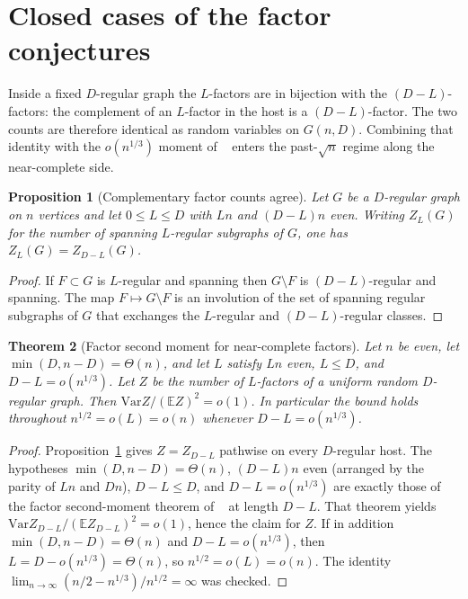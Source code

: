 \documentclass[11pt]{article}
\newtheorem{theorem}{Theorem}
\newtheorem{proposition}[theorem]{Proposition}
\newcommand{\EE}{\mathbb{E}}
\newcommand{\Var}{\mathrm{Var}}
\begin{document}
\section{Closed cases of the factor conjectures}
\label{sec:factor-complementary}

Inside a fixed \(D\)-regular graph the \(L\)-factors are in bijection with the
\((D-L)\)-factors: the complement of an \(L\)-factor in the host is a
\((D-L)\)-factor. The two counts are therefore identical as random variables
on \(G(n,D)\). Combining that identity with the \(o(n^{1/3})\) moment of
~\cite{PlusOneV1} enters the past-\(\sqrt{n}\) regime along the near-complete
side.

\begin{proposition}[Complementary factor counts agree]
\label{prop:factor-complement-bijection}
Let \(G\) be a \(D\)-regular graph on \(n\) vertices and let \(0\le L\le D\) with
\(Ln\) and \((D-L)n\) even. Writing \(Z_L(G)\) for the number of spanning
\(L\)-regular subgraphs of \(G\), one has \(Z_L(G)=Z_{D-L}(G)\).
\end{proposition}

\begin{proof}
If \(F\subset G\) is \(L\)-regular and spanning then \(G\setminus F\) is
\((D-L)\)-regular and spanning. The map \(F\mapsto G\setminus F\) is an
involution of the set of spanning regular subgraphs of \(G\) that exchanges
the \(L\)-regular and \((D-L)\)-regular classes.
\end{proof}

\begin{theorem}[Factor second moment for near-complete factors]
\label{thm:factor-complementary}
Let \(n\) be even, let \(\min(D,n-D)=\Theta(n)\), and let \(L\) satisfy \(Ln\) even,
\(L\le D\), and \(D-L=o(n^{1/3})\). Let \(Z\) be the number of \(L\)-factors of a
uniform random \(D\)-regular graph. Then \(\Var Z/(\EE Z)^2=o(1)\).
In particular the bound holds throughout
\(n^{1/2}=o(L)=o(n)\) whenever \(D-L=o(n^{1/3})\).
\end{theorem}

\begin{proof}
Proposition~\ref{prop:factor-complement-bijection} gives \(Z=Z_{D-L}\) pathwise on
every \(D\)-regular host. The hypotheses \(\min(D,n-D)=\Theta(n)\),
\((D-L)n\) even (arranged by the parity of \(Ln\) and \(Dn\)), \(D-L\le D\), and
\(D-L=o(n^{1/3})\) are exactly those of the factor second-moment theorem of
~\cite{PlusOneV1} at length \(D-L\). That theorem yields
\(\Var Z_{D-L}/(\EE Z_{D-L})^2=o(1)\), hence the claim for \(Z\).
If in addition \(\min(D,n-D)=\Theta(n)\) and \(D-L=o(n^{1/3})\), then
\(L=D-o(n^{1/3})=\Theta(n)\), so \(n^{1/2}=o(L)=o(n)\). The identity
\(\lim_{n\to\infty}(n/2-n^{1/3})/n^{1/2}=\infty\) was checked.
\end{proof}
\end{document}
